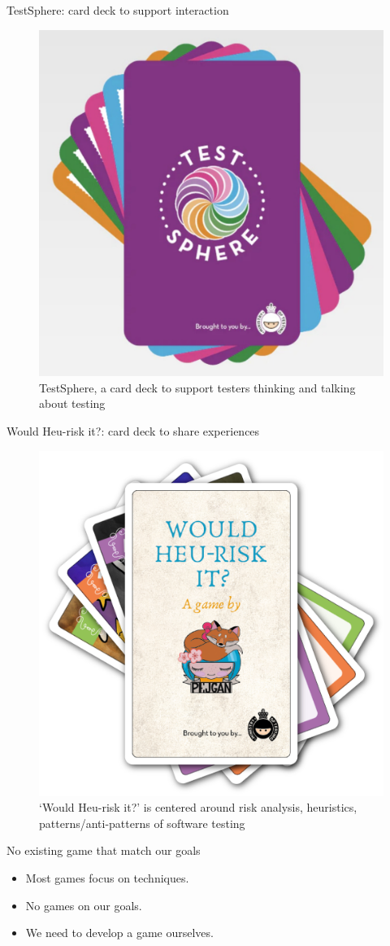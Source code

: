 \documentclass[aspectratio=169]{beamer}
\begin{document}
\begin{frame}{TestSphere: card deck to support interaction}
\begin{figure}
    \centering
    \includegraphics[width=0.5\linewidth]{images//games/testsphere}
    \caption{TestSphere, a card deck to support testers thinking and talking about testing}
\end{figure}
\end{frame}

\begin{frame}{Would Heu-risk it?: card deck to share experiences}
\begin{figure}
    \centering
    \includegraphics[width=0.5\linewidth]{images//games/would}
    \caption{`Would Heu-risk it?' is centered around risk analysis, heuristics, patterns/anti-patterns of software testing}
\end{figure}
\end{frame}

\begin{frame}{No existing game that match our goals}
    \begin{itemize}
        \item Most games focus on techniques.
        \item No games on our goals.
        \item We need to develop a game ourselves.
    \end{itemize}
\end{frame}
\end{document}
